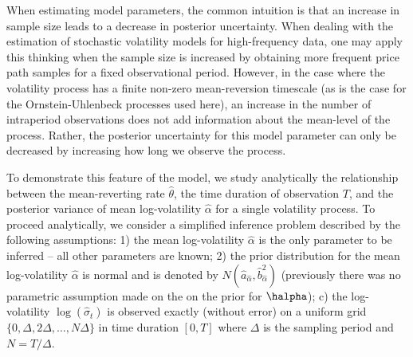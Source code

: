 When estimating model parameters, the common intuition is that an increase in sample size leads to a decrease in posterior uncertainty. When dealing with the estimation of stochastic volatility models for high-frequency data, one may apply this thinking when the sample size is increased by obtaining more frequent price path samples for a fixed observational period. However, in the case where the volatility process has a finite non-zero mean-reversion timescale (as is the case for the Ornstein-Uhlenbeck processes used here), an increase in the number of intraperiod observations does not add information about the mean-level of the process. Rather, the posterior uncertainty for this model parameter can only be decreased by increasing how long we observe the process.

To demonstrate this feature of the model, we study analytically the relationship between the mean-reverting rate $\hat{\theta}$, the time duration of observation $T$, and the posterior variance of mean log-volatility $\hat{\alpha}$ for a single volatility process.  To proceed analytically, we consider a simplified inference problem described by the following assumptions:  1) the mean log-volatility $\hat{\alpha}$ is the only parameter to be inferred -- all other parameters are known; 2) the prior distribution for the mean log-volatility $\hat{\alpha}$ is normal and is denoted by $N(\hat{a}_{\hat{\alpha}}, \hat{b}^2_{\hat{\alpha}}) $ (previously there was no parametric assumption made on the on the prior for $\halpha$); c) the log-volatility $\log( \hat{ \sigma }_t)$ is observed exactly (without error) on a uniform grid $\{0, \Delta, 2\Delta, \ldots , N\Delta \} $ in time duration $[0, T]$ where $\Delta $ is the sampling period and $N=T/\Delta $.

